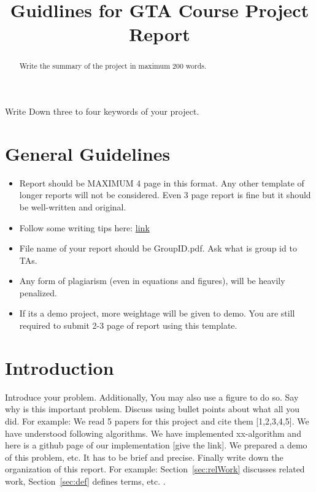 \documentclass{article}
\title{Guidlines for GTA Course Project Report}
\begin{document}
%
\maketitle
%
\begin{abstract}
Write the summary of the project in maximum 200 words. \vspace{5cm}
\end{abstract}
%
\begin{keywords}
Write Down three to four keywords of your project.
\end{keywords}
%
\section{General Guidelines}
\label{sec:intro}
\begin{itemize}
    \item Report should be MAXIMUM 4 page in this format. Any other template of longer reports will not be considered. Even 3 page report is fine but it should be well-written and original.
    \item Follow some writing tips here: 
    \href{https://docs.google.com/document/d/14gSblT_vE4hQb_mbMQkq3QOi0lrIlOvUWl7IReEuH5s/edit?usp=sharing}{link}
    \item File name of your report should be GroupID.pdf. Ask what is group id to TAs.
    \item Any form of plagiarism (even in equations and figures), will be heavily penalized. 
    \item If its a demo project, more weightage will be given to demo. You are still required to submit 2-3 page of report using this template.
\end{itemize}

\section{Introduction}
\label{sec:intro}
Introduce your problem. Additionally, You may also use a figure to do so. Say why is this important problem. Discuss using bullet points about what all you did. For example: We read 5 papers for this project and cite them [1,2,3,4,5]. We have understood following algorithms. We have implemented xx-algorithm and here is a github page of our implementation [give the link]. We prepared a demo of this problem, etc. It has to be brief and precise.
Finally write down the organization of this report. For example: Section~\ref{sec:relWork} discusses related work, Section~\ref{sec:def} defines terms, etc.
\newpage
.
\newpage
\end{document}
